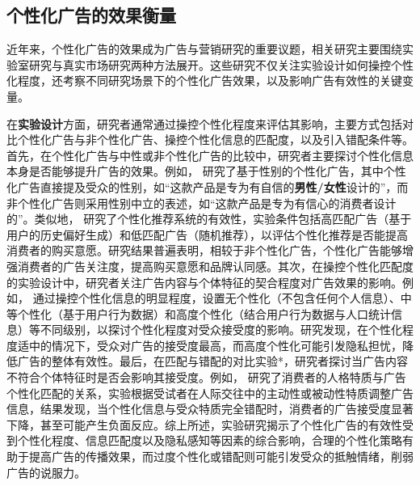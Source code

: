 \subsection{个性化广告的效果衡量}

近年来，个性化广告的效果成为广告与营销研究的重要议题，相关研究主要围绕实验室研究与真实市场研究两种方法展开。这些研究不仅关注实验设计如何操控个性化程度，还考察不同研究场景下的个性化广告效果，以及影响广告有效性的关键变量。

在\textbf{实验设计}方面，研究者通常通过操控个性化程度来评估其影响，主要方式包括对比个性化广告与非个性化广告、操控个性化信息的匹配度，以及引入错配条件等。首先，在个性化广告与中性或非个性化广告的比较中，研究者主要探讨个性化信息本身是否能够提升广告的效果。例如，\citet{de2015me} 研究了基于性别的个性化广告，其中个性化广告直接提及受众的性别，如“这款产品是专为有自信的\textbf{男性/女性}设计的”，而非个性化广告则采用性别中立的表述，如“这款产品是专为有信心的消费者设计的”。类似地，\citet{ho2008personalization} 研究了个性化推荐系统的有效性，实验条件包括高匹配广告（基于用户的历史偏好生成）和低匹配广告（随机推荐），以评估个性化推荐是否能提高消费者的购买意愿。研究结果普遍表明，相较于非个性化广告，个性化广告能够增强消费者的广告关注度，提高购买意愿和品牌认同感。其次，在操控个性化匹配度的实验设计中，研究者关注广告内容与个体特征的契合程度对广告效果的影响。例如，\citet{aguirre2015unraveling} 通过操控个性化信息的明显程度，设置无个性化（不包含任何个人信息）、中等个性化（基于用户行为数据）和高度个性化（结合用户行为数据与人口统计信息）等不同级别，以探讨个性化程度对受众接受度的影响。研究发现，在个性化程度适中的情况下，受众对广告的接受度最高，而高度个性化可能引发隐私担忧，降低广告的整体有效性。最后，在匹配与错配的对比实验*，研究者探讨当广告内容不符合个体特征时是否会影响其接受度。例如，\citet{moon2002personalization} 研究了消费者的人格特质与广告个性化匹配的关系，实验根据受试者在人际交往中的主动性或被动性特质调整广告信息，结果发现，当个性化信息与受众特质完全错配时，消费者的广告接受度显著下降，甚至可能产生负面反应。综上所述，实验研究揭示了个性化广告的有效性受到个性化程度、信息匹配度以及隐私感知等因素的综合影响，合理的个性化策略有助于提高广告的传播效果，而过度个性化或错配则可能引发受众的抵触情绪，削弱广告的说服力。

